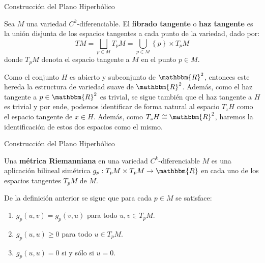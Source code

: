 \documentclass[xcolor=dvipsnames]{beamer}
\theoremstyle{largebreak}
\newcommand\cf[3]{\ensuremath{#1:#2\rightarrow#3}}
\newcommand{\bbm}[1]{\ensuremath{\mathbbm{#1}}}
\begin{document}
\begin{frame}{Construcción del Plano Hiperbólico}
    \begin{mydef}
        Sea $M$ una variedad $C^k$-diferenciable. El \textbf{fibrado tangente} o \textbf{haz tangente} es la unión disjunta de los espacios tangentes a cada punto de la variedad, dado por:
        \begin{equation*}
            TM=\bigsqcup_{ p\in M}T_pM=\bigcup_{ p\in M}\left\{p\right\}\times T_pM
        \end{equation*}
        donde $T_pM$ denota el espacio tangente a $M$ en el punto $p\in M$.
    \end{mydef}

    Como el conjunto $H$ es abierto y subconjunto de $\bbm{R}^2$, entonces este hereda la estructura de variedad suave de $\bbm{R}^2$. Además, como el haz tangente a $p\in\bbm{R}^2$ es trivial, se sigue también que el haz tangente a $H$ es trivial y por ende, podemos identificar de forma natural al espacio $T_zH$ como el espacio tangente de $x\in H$. Además, como $T_zH\cong\bbm{R}^2$, haremos la identificación de estos dos espacios como el mismo.
\end{frame}

\begin{frame}{Construcción del Plano Hiperbólico}
    \begin{mydef}
        Una \textbf{métrica Riemanniana} en una variedad $C^k$-diferenciable $M$ es una aplicación bilineal simétrica $\cf{g_p}{T_pM\times T_pM}{\bbm{R}}$ en cada uno de los espacios tangentes $T_pM$ de $M$.
    \end{mydef}

    \begin{obs}
        De la definición anterior se sigue que para cada $p\in M$ se satisface:
        \begin{enumerate}[label = \textit{(\arabic*)}]
            \item $g_p(u,v)=g_p(v,u)$ para todo $u,v\in T_pM$.
            \item $g_p(u,u)\geq0$ para todo $u\in T_pM$.
            \item $g_p(u,u)=0$ si y sólo si $u=0$.
        \end{enumerate}
    \end{obs}
\end{frame}
\end{document}
